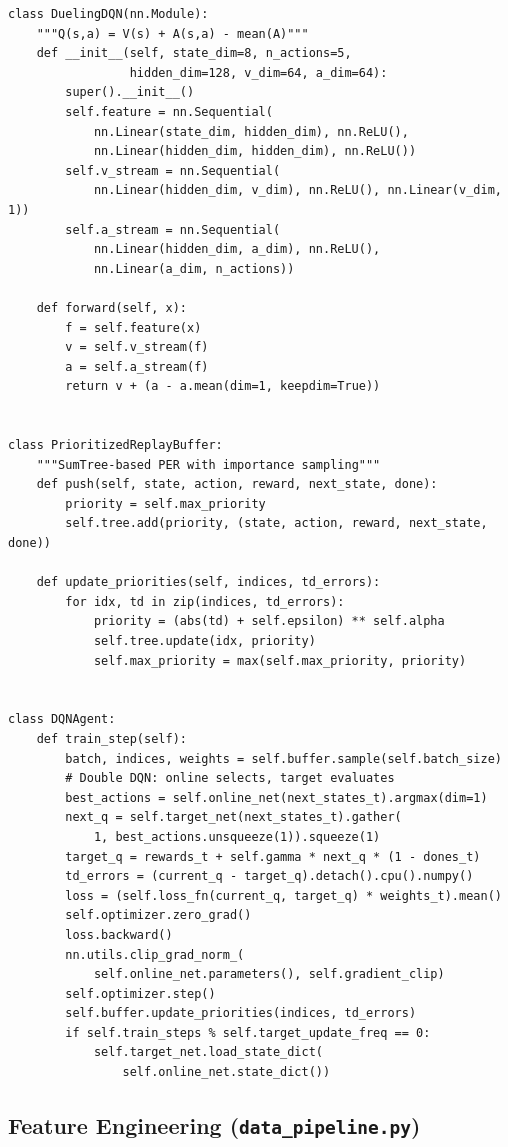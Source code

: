 \documentclass[11pt,a4paper]{article}
\begin{document}
\begin{lstlisting}
class DuelingDQN(nn.Module):
    """Q(s,a) = V(s) + A(s,a) - mean(A)"""
    def __init__(self, state_dim=8, n_actions=5,
                 hidden_dim=128, v_dim=64, a_dim=64):
        super().__init__()
        self.feature = nn.Sequential(
            nn.Linear(state_dim, hidden_dim), nn.ReLU(),
            nn.Linear(hidden_dim, hidden_dim), nn.ReLU())
        self.v_stream = nn.Sequential(
            nn.Linear(hidden_dim, v_dim), nn.ReLU(), nn.Linear(v_dim, 1))
        self.a_stream = nn.Sequential(
            nn.Linear(hidden_dim, a_dim), nn.ReLU(),
            nn.Linear(a_dim, n_actions))

    def forward(self, x):
        f = self.feature(x)
        v = self.v_stream(f)
        a = self.a_stream(f)
        return v + (a - a.mean(dim=1, keepdim=True))


class PrioritizedReplayBuffer:
    """SumTree-based PER with importance sampling"""
    def push(self, state, action, reward, next_state, done):
        priority = self.max_priority
        self.tree.add(priority, (state, action, reward, next_state, done))

    def update_priorities(self, indices, td_errors):
        for idx, td in zip(indices, td_errors):
            priority = (abs(td) + self.epsilon) ** self.alpha
            self.tree.update(idx, priority)
            self.max_priority = max(self.max_priority, priority)


class DQNAgent:
    def train_step(self):
        batch, indices, weights = self.buffer.sample(self.batch_size)
        # Double DQN: online selects, target evaluates
        best_actions = self.online_net(next_states_t).argmax(dim=1)
        next_q = self.target_net(next_states_t).gather(
            1, best_actions.unsqueeze(1)).squeeze(1)
        target_q = rewards_t + self.gamma * next_q * (1 - dones_t)
        td_errors = (current_q - target_q).detach().cpu().numpy()
        loss = (self.loss_fn(current_q, target_q) * weights_t).mean()
        self.optimizer.zero_grad()
        loss.backward()
        nn.utils.clip_grad_norm_(
            self.online_net.parameters(), self.gradient_clip)
        self.optimizer.step()
        self.buffer.update_priorities(indices, td_errors)
        if self.train_steps % self.target_update_freq == 0:
            self.target_net.load_state_dict(
                self.online_net.state_dict())
\end{lstlisting}

\subsection{Feature Engineering (\texttt{data\_pipeline.py})}
\end{document}
